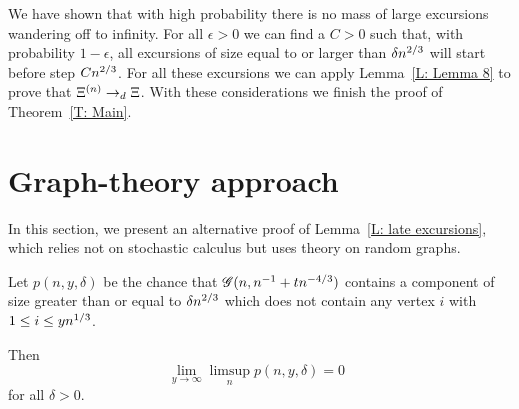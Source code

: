 We have shown that with high probability there is no mass of large excursions wandering off to infinity.
For all $\epsilon>0$ we can find a $C>0$ such that,
with probability $1-\epsilon$,
all excursions of size equal to or larger than $\delta n^{2 / 3}$ will start before step $Cn^{2 / 3}$.
For all these excursions we can apply Lemma~\ref{L: Lemma 8} to prove that $\Xi^{(n)} \rightarrow_d \Xi$.
With these considerations we finish the proof of Theorem~\ref{T: Main}.

\section{Graph-theory approach}

In this section, we present an  alternative proof of Lemma~\ref{L: late excursions},
which relies not on stochastic calculus but uses theory on random graphs.

\begin{lemma} \label{L: Lemma 9}
	Let $p(n, y, \delta)$ be the chance that $\mathscr{G}(n, n^{-1} + tn^{-4/3})$
	contains a component of size greater than or equal to $\delta n^{2 / 3}$
	which does not contain any vertex $i$ with $1 \leq i \leq yn^{1 / 3}$.
	
	Then
	\begin{equation}
	\lim_{y \rightarrow \infty} \limsup_n p(n, y, \delta) = 0 \enspace
	\end{equation}
	for all $\delta > 0$.
\end{lemma}

